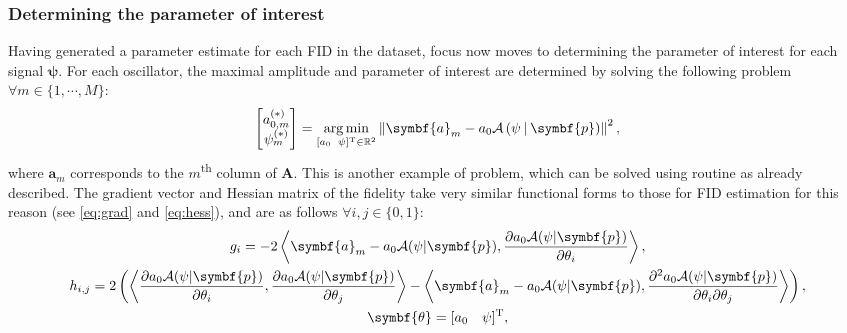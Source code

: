 \subsubsection{Determining the parameter of interest}
Having generated a parameter estimate for each \ac{FID} in the dataset, focus
now moves to determining the parameter of interest for each signal $\symbf{\psi}$.
For each oscillator, the maximal amplitude and parameter of
interest are determined by solving the following problem $\forall m
\in \lbrace 1, \cdots, M \rbrace$:
\begin{equation}
    \begin{bmatrix}
        a_{0,m}^{(*)} \\
        \psi_{m}^{(*)}
    \end{bmatrix} =
    \argmin_{
        [a_0 \hspace*{5pt} \psi]\T \in \mathbb{R}^2
    }
    \left\lVert
        \symbf{a}_m - a_0 \mathcal{A} \left(\psi \hspace*{2pt} | \hspace*{2pt} \symbf{p}\right)
    \right\rVert^2,
\end{equation}
where $\symbf{a}_m$ corresponds to the $m$\textsuperscript{th} column of
$\symbf{A}$.  This is another example of  problem, which can be solved using
 routine as already described. The gradient vector and Hessian matrix
of the fidelity take very similar functional forms to those for \ac{FID}
estimation for this reason (see \cref{eq:grad} and \cref{eq:hess}), and are as
follows $\forall
i, j \in \lbrace 0, 1 \rbrace$:
\begin{subequations}
    \begin{gather}
        g_i =
            -2 \left \langle
                \symbf{a}_m - a_0 \mathcal{A}(\psi | \symbf{p}),
                \frac{\partial a_0 \mathcal{A} (\psi | \symbf{p})}
                {\partial \theta_i}
            \right \rangle,\\
        h_{i,j} =
            2 \left( \left \langle
                \frac{\partial a_0 \mathcal{A} (\psi | \symbf{p})}{\partial \theta_i},
                \frac{\partial a_0 \mathcal{A} (\psi | \symbf{p})}{\partial \theta_j}
            \right \rangle -
            \left \langle
                \symbf{a}_m - a_0 \mathcal{A}(\psi | \symbf{p}),
                \frac{\partial^2 a_0 \mathcal{A} (\psi | \symbf{p})}{\partial
                \theta_i\partial \theta_j}
            \right \rangle \right), \\
            \symbf{\theta} = [a_0 \hspace*{10pt} \psi]\T,
    \end{gather}
\end{subequations}

